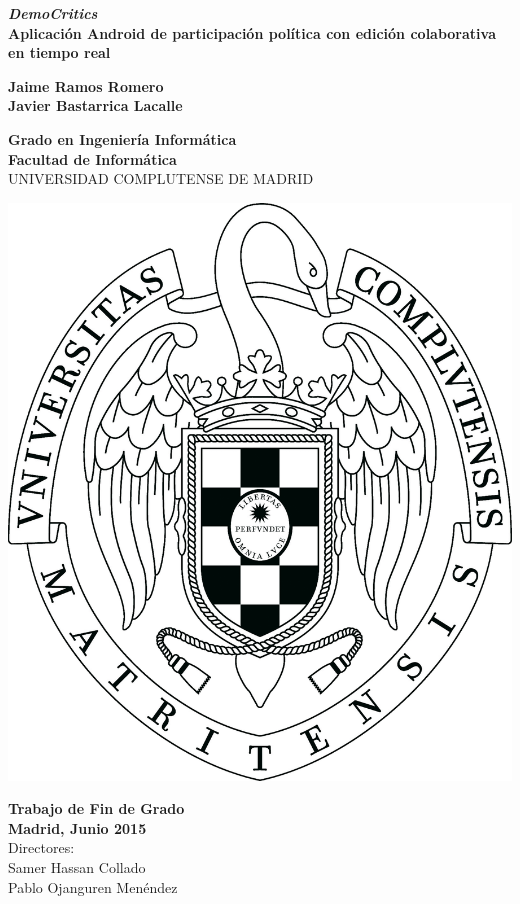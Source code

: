 \setcounter{page}{1}

\newpage
\thispagestyle{cover}
\begin{center}
  {\Huge \bf \textit{DemoCritics}} \\
  \vspace*{0.5cm}
  {\large \bf Aplicación Android de participación política con edición colaborativa en tiempo real}

  \vfill
  {\LARGE\bf Jaime Ramos Romero\\
    \vspace*{0.5cm}
	     Javier Bastarrica Lacalle}

  \vfill

  {\Large\bf Grado en Ingeniería Informática\\}
  {\Large\bf Facultad de Informática\\}
  \vspace*{0.4cm}
  {UNIVERSIDAD COMPLUTENSE DE MADRID}
  \vspace*{0.8cm}
  
   \begin{center}
   \includegraphics[keepaspectratio, scale=0.12]{Media/ucmlogo.png}
   \end{center}
  
  \vspace*{0.5cm}

  {\large\bf Trabajo de Fin de Grado\\
             Madrid, Junio 2015\\}
  \vspace*{0.7cm}
  {\large Directores:\\
          Samer Hassan Collado\\
          Pablo Ojanguren Menéndez}
  \vfill

  \rhead{}
  \rfoot{}
  \fancyhf{}

\end{center}
